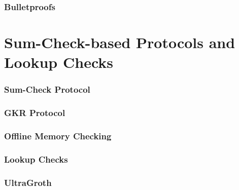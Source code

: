 \documentclass{config/zkdl-template}
\begin{document}
    \section{Bulletproofs}\label{section:bulletproofs}
    

    \part{Sum-Check-based Protocols and Lookup Checks}
    

    \section{Sum-Check Protocol}\label{section:sumcheck}
    

    \section{GKR Protocol}\label{section:gkr}
    
    
    \section{Offline Memory Checking}\label{section:toolkit}
    

    \section{Lookup Checks}\label{section:lookups}
    

    \section{UltraGroth}\label{section:ultragroth}
    

\end{document}
